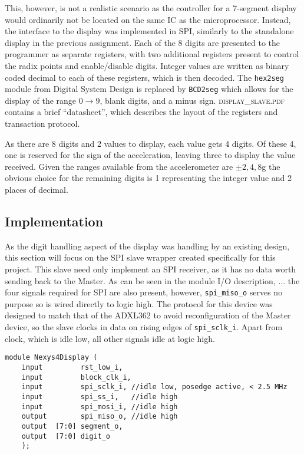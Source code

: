 \documentclass[11pt,british]{report}
\begin{document}
This, however, is not a realistic scenario as the controller for a 7-segment display would ordinarily not be located on the same IC as the microprocessor. Instead, the interface to the display was implemented in SPI, similarly to the standalone display in the previous assignment. Each of the 8 digits are presented to the programmer as separate registers, with two additional registers present to control the radix points and enable/disable digits. Integer values are written as binary coded decimal to each of these registers, which is then decoded. The \texttt{hex2seg} module from Digital System Design is replaced by \texttt{BCD2seg} which allows for the display of the range $0\rightarrow 9$, blank digits, and a minus sign. \textsc{display_slave.pdf} contains a brief ``datasheet'', which describes the layout of the registers and transaction protocol.

As there are 8 digits and 2 values to display, each value gets 4 digits. Of these 4, one is reserved for the sign of the acceleration, leaving three to display the value received. Given the ranges available from the accelerometer are $\pm2,4,8$g the obvious choice for the remaining digits is 1 representing the integer value and 2 places of decimal.

\subsection{Implementation}
As the digit handling aspect of the display was handling by an existing design, this section will focus on the SPI slave wrapper created specifically for this project. This slave need only implement an SPI receiver, as it has no data worth sending back to the Master. As can be seen in the module I/O description, ... the four signals required for SPI are also present, however, \texttt{spi_miso_o} serves no purpose so is wired directly to logic high. The protocol for this device was designed to match that of the ADXL362 to avoid reconfiguration of the Master device, so the slave clocks in data on rising edges of \texttt{spi_sclk_i}. Apart from clock, which is idle low, all other signals idle at logic high.
\begin{lstlisting}[style={verilog-style}]
    module Nexys4Display (
    input         rst_low_i,
    input         block_clk_i,
    input         spi_sclk_i, //idle low, posedge active, < 2.5 MHz
    input         spi_ss_i,   //idle high
    input         spi_mosi_i, //idle high
    output        spi_miso_o, //idle high
    output  [7:0] segment_o, 
    output  [7:0] digit_o
    );
\end{lstlisting}
\end{document}
